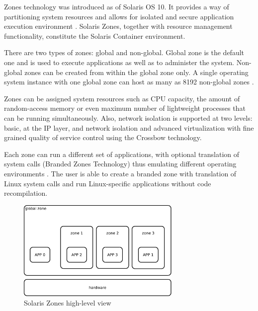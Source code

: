 \documentclass[11pt]{book}
\begin{document}
        Zones technology was introduced as of Solaris OS 10. It provides a way of partitioning system resources and
        allows for isolated and secure application execution environment \cite{sag}. Solaris Zones, together with
        resource management functionality, constitute the Solaris Container environment.

        There are two types of zones: global and non-global. Global zone is the default one and is used to execute
        applications as well as to administer the system. Non-global zones can be created from within the global zone
        only. A single operating system instance with one global zone can host as many as 8192 non-global zones
        \cite{sag}.

        Zones can be assigned system resources such as CPU capacity, the amount of random-access memory or even maximum
        number of lightweight processes that can be running simultaneously. Also, network isolation is supported at two
        levels: basic, at the IP layer, and network isolation and advanced virtualization with fine grained quality of
        service control using the Crossbow technology.

        Each zone can run a different set of applications, with optional translation of system calls (Branded Zones
        Technology) thus emulating different operating environments \cite{sag}. The user is able to create a branded
        zone with translation of Linux system calls and run Linux-specific applications without code recompilation.

        \begin{figure}[H]
          \begin{center}
            \includegraphics[width=0.7\textwidth]{img/solaris/zones-high-level.pdf}
          \end{center}

          \caption{Solaris Zones high-level view}
        \end{figure}
\end{document}
